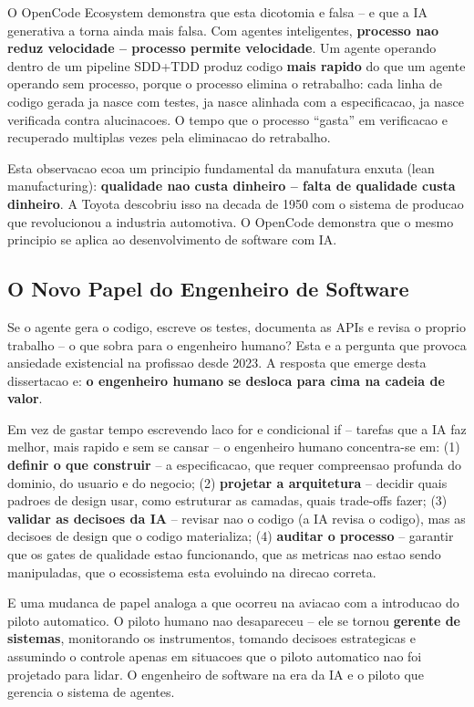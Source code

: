 \documentclass[12pt,a4paper,oneside,sumario=tradicional,chapter=TITLE,section=TITLE,subsection=TITLE,english,brazil]{abntex2}
\begin{document}
O OpenCode Ecosystem demonstra que esta dicotomia e falsa -- e que a IA generativa a torna ainda mais falsa. Com agentes inteligentes, \textbf{processo nao reduz velocidade -- processo permite velocidade}. Um agente operando dentro de um pipeline SDD+TDD produz codigo \textbf{mais rapido} do que um agente operando sem processo, porque o processo elimina o retrabalho: cada linha de codigo gerada ja nasce com testes, ja nasce alinhada com a especificacao, ja nasce verificada contra alucinacoes. O tempo que o processo ``gasta'' em verificacao e recuperado multiplas vezes pela eliminacao do retrabalho.

Esta observacao ecoa um principio fundamental da manufatura enxuta (lean manufacturing): \textbf{qualidade nao custa dinheiro -- falta de qualidade custa dinheiro}. A Toyota descobriu isso na decada de 1950 com o sistema de producao que revolucionou a industria automotiva. O OpenCode demonstra que o mesmo principio se aplica ao desenvolvimento de software com IA.

\subsection{O Novo Papel do Engenheiro de Software}

Se o agente gera o codigo, escreve os testes, documenta as APIs e revisa o proprio trabalho -- o que sobra para o engenheiro humano? Esta e a pergunta que provoca ansiedade existencial na profissao desde 2023. A resposta que emerge desta dissertacao e: \textbf{o engenheiro humano se desloca para cima na cadeia de valor}.

Em vez de gastar tempo escrevendo laco for e condicional if -- tarefas que a IA faz melhor, mais rapido e sem se cansar -- o engenheiro humano concentra-se em: (1) \textbf{definir o que construir} -- a especificacao, que requer compreensao profunda do dominio, do usuario e do negocio; (2) \textbf{projetar a arquitetura} -- decidir quais padroes de design usar, como estruturar as camadas, quais trade-offs fazer; (3) \textbf{validar as decisoes da IA} -- revisar nao o codigo (a IA revisa o codigo), mas as decisoes de design que o codigo materializa; (4) \textbf{auditar o processo} -- garantir que os gates de qualidade estao funcionando, que as metricas nao estao sendo manipuladas, que o ecossistema esta evoluindo na direcao correta.

E uma mudanca de papel analoga a que ocorreu na aviacao com a introducao do piloto automatico. O piloto humano nao desapareceu -- ele se tornou \textbf{gerente de sistemas}, monitorando os instrumentos, tomando decisoes estrategicas e assumindo o controle apenas em situacoes que o piloto automatico nao foi projetado para lidar. O engenheiro de software na era da IA e o piloto que gerencia o sistema de agentes.
\end{document}
